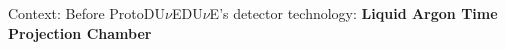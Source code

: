 \documentclass[10pt]{beamer}
\begin{document}
\begin{frame}{Context: Before \texorpdfstring{ProtoDU$\nu$E}{ProtoDUNE}}{DU$\nu$E's detector technology: \textbf{Liquid Argon Time Projection Chamber}}
\begin{scriptsize}
%    			
    	\end{scriptsize}
    \end{frame}
    
    
\end{document}

